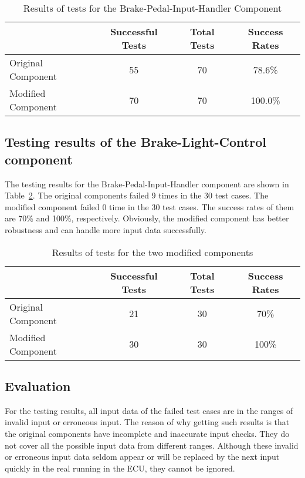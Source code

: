 \begin{table}[htb]
\centering
\begin{tabular}{|p{1.5cm}|c|c|c|}\hline
      & Successful Tests & Total Tests & Success Rates\\ \hline
Original Component & 55 & 70 & 78.6\% \\ \hline
Modified Component & 70 & 70 & 100.0\% \\ \hline
\end{tabular}
\caption{Results of tests for the Brake-Pedal-Input-Handler Component}
\label{tab:resultsTestingOriginalComp}
\vspace{-.6cm}
\end{table}

\subsection{Testing results of the Brake-Light-Control component}\label{sec:resultsModified}

The testing results for the Brake-Pedal-Input-Handler component %
are shown in Table~\ref{tab:resultsTestingModifiedComp}. The original components failed 9 times in the 30 test cases.  The modified component failed 0 time in the 30 test cases. The success rates of them are 70\% and 100\%, respectively. Obviously, the modified component has better robustness and can handle more input data successfully.

\begin{table}[htb]
\centering
\begin{tabular}{|p{1.5cm}|c|c|c|}\hline
      & Successful Tests & Total Tests & Success Rates\\ \hline
Original Component & 21 & 30 & 70\% \\ \hline
Modified Component & 30 & 30 & 100\% \\ \hline
\end{tabular}
\caption{Results of tests for the two modified components}
\label{tab:resultsTestingModifiedComp}
\vspace{-.6cm}
\end{table}

\subsection{Evaluation}\label{sec:evaluations}

For the testing results, all input data of the failed test cases are in the ranges of invalid input or erroneous input. The reason of why getting such results is that the original components have incomplete and inaccurate input checks. They do not cover all the possible input data from different ranges. Although these invalid or erroneous input data seldom appear or will be replaced by the next input quickly in the real running in the ECU, they cannot be ignored. 

